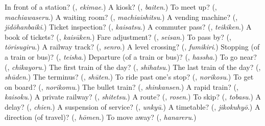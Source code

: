\begin{tcolorbox}[breakable,colback=teal!4,colframe=teal!35!black,title={Before you move on}]
In front of a station? (\textbf{}, \emph{ekimae}.) A kiosk? (\textbf{}, \emph{baiten}.) To meet up? (\textbf{}, \emph{machiawaseru}.) A waiting room? (\textbf{}, \emph{machiaishitsu}.) A vending machine? (\textbf{}, \emph{jidōhanbaiki}.) Ticket inspection? (\textbf{}, \emph{kaisatsu}.) A commuter pass? (\textbf{}, \emph{teikiken}.) A book of tickets? (\textbf{}, \emph{kaisūken}.) Fare adjustment? (\textbf{}, \emph{seisan}.) To pass by? (\textbf{}, \emph{tōrisugiru}.) A railway track? (\textbf{}, \emph{senro}.) A level crossing? (\textbf{}, \emph{fumikiri}.) Stopping (of a train or bus)? (\textbf{}, \emph{teisha}.) Departure (of a train or bus)? (\textbf{}, \emph{hassha}.) To go near? (\textbf{}, \emph{chikayoru}.) The first train of the day? (\textbf{}, \emph{shihatsu}.) The last train of the day? (\textbf{}, \emph{shūden}.) The terminus? (\textbf{}, \emph{shūten}.) To ride past one's stop? (\textbf{}, \emph{norikosu}.) To get on board? (\textbf{}, \emph{norikomu}.) The bullet train? (\textbf{}, \emph{shinkansen}.) A rapid train? (\textbf{}, \emph{kaisoku}.) A private railway? (\textbf{}, \emph{shitetsu}.) A route? (\textbf{}, \emph{rosen}.) To skip? (\textbf{}, \emph{tobasu}.) A delay? (\textbf{}, \emph{chien}.) A suspension of service? (\textbf{}, \emph{unkyū}.) A timetable? (\textbf{}, \emph{jikokuhyō}.) A direction (of travel)? (\textbf{}, \emph{hōmen}.) To move away? (\textbf{}, \emph{hanareru}.)
\end{tcolorbox}
